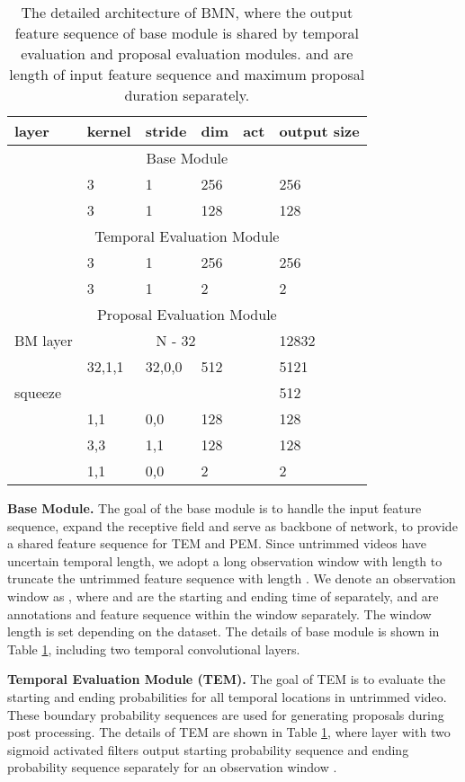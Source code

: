 \documentclass[10pt,twocolumn,letterpaper]{article}
\begin{document}
\begin{table}[tbp]
\centering
\caption{The detailed architecture of BMN, where the output feature sequence of base module is shared by temporal evaluation and proposal evaluation modules.  and  are length of input feature sequence and maximum proposal duration separately.   }
\small
\begin{tabular}{p{1.28cm}|p{0.6cm}p{0.6cm}p{0.3cm}p{1.0cm}|p{2.0cm}}
\hline
 layer & kernel & stride & dim & act & output size\\
\hline
\multicolumn{6}{c}{ Base Module} \\
\hline
  & 3 &  1 &  256 &  & 256\\
\hline
  & 3 &  1 &  128 &  & 128\\
\hline
\multicolumn{6}{c}{ Temporal Evaluation Module} \\
\hline
  & 3 &  1 &  256 &  & 256\\
\hline
  &  3 &  1 &  2 &   & 2\\
\hline
\multicolumn{6}{c}{ Proposal Evaluation Module}\\
\hline
 BM layer & \multicolumn{4}{c|}{ N - 32}  & 12832\\
\hline
  & 32,1,1 & 32,0,0 & 512 &   & 5121\\
\hline
 squeeze & & & & & 512\\
\hline
  & 1,1 & 0,0 & 128 &    & 128\\
\hline
  & 3,3 & 1,1 & 128 &    & 128\\
\hline 
  & 1,1 & 0,0 & 2 &   &  2\\
\hline
\end{tabular}
\label{table:bmn_layer}
\end{table}

\noindent
\textbf{Base Module.}
The goal of the base module is to handle the input feature sequence, expand the receptive field and serve as backbone of network, to provide a shared feature sequence for TEM and PEM.
Since untrimmed videos have uncertain temporal length, we adopt a long observation window with length  to truncate the untrimmed feature sequence with length .
We denote an observation window as  , where  and  are the starting and ending time of  separately,  and    are annotations and feature sequence  within the window separately.
The window length  is set depending on the dataset.
The details of base module is shown in Table \ref{table:bmn_layer}, including two temporal convolutional layers.

\noindent
\textbf{Temporal Evaluation Module (TEM).}
The goal of TEM is to evaluate the starting and ending probabilities for all temporal locations in untrimmed video. These boundary probability sequences are used for generating proposals during post processing.
The details of TEM are shown in Table \ref{table:bmn_layer}, where  layer with two sigmoid activated filters output starting probability sequence  and ending probability sequence  separately for an observation window .
\end{document}
